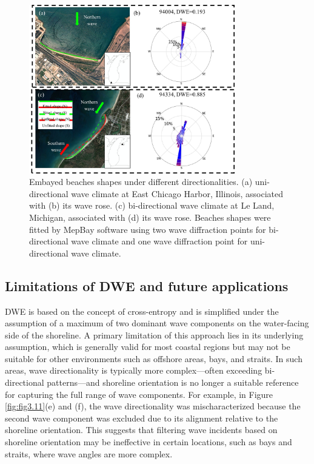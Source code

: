 \begin{figure}[htbp]
  \centering
  \includegraphics[width=0.8\textwidth]{chapter3/resources/figure3-12.jpg}
  \caption{Embayed beaches shapes under different directionalities. (a) uni-directional wave climate at East Chicago Harbor, Illinois, associated with (b) its wave rose. (c) bi-directional wave climate at Le Land, Michigan, associated with (d) its wave rose. Beaches shapes were fitted by MepBay software using two wave diffraction points for bi-directional wave climate and one wave diffraction point for uni-directional wave climate.}
  \label{fig:fig3.12}
\end{figure}

\subsection{Limitations of DWE and future applications}
\label{c3_Limitations of DWE and future applications}

DWE is based on the concept of cross-entropy and is simplified under the
assumption of a maximum of two dominant wave components on the water-facing side
of the shoreline. A primary limitation of this approach lies in its underlying
assumption, which is generally valid for most coastal regions but may not be
suitable for other environments such as offshore areas, bays, and straits. In
such areas, wave directionality is typically more complex—often exceeding
bi-directional patterns—and shoreline orientation is no longer a suitable
reference for capturing the full range of wave components. For example, in
Figure \ref{fig:fig3.11}(e) and (f), the wave directionality was
mischaracterized because the second wave component was excluded due to its
alignment relative to the shoreline orientation. This suggests that filtering
wave incidents based on shoreline orientation may be ineffective in certain
locations, such as bays and straits, where wave angles are more complex.

